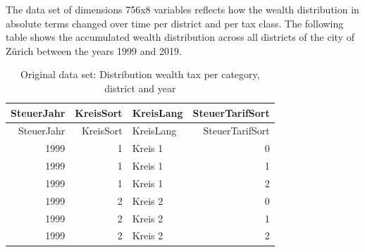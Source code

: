 \documentclass[
]{article}
\begin{document}
The data set of dimensions 756x8 variables reflects how the wealth
distribution in absolute terms changed over time per district and per
tax class. The following table shows the accumulated wealth distribution
across all districts of the city of Zürich between the years 1999 and
2019.

\begin{longtable}[]{@{}rrlr@{}}
\caption{Original data set: Distribution wealth tax per category,
district and year}\tabularnewline
\toprule
SteuerJahr & KreisSort & KreisLang & SteuerTarifSort\tabularnewline
\midrule
\endfirsthead
\toprule
SteuerJahr & KreisSort & KreisLang & SteuerTarifSort\tabularnewline
\midrule
\endhead
1999 & 1 & Kreis 1 & 0\tabularnewline
1999 & 1 & Kreis 1 & 1\tabularnewline
1999 & 1 & Kreis 1 & 2\tabularnewline
1999 & 2 & Kreis 2 & 0\tabularnewline
1999 & 2 & Kreis 2 & 1\tabularnewline
1999 & 2 & Kreis 2 & 2\tabularnewline
\bottomrule
\end{longtable}
\end{document}
